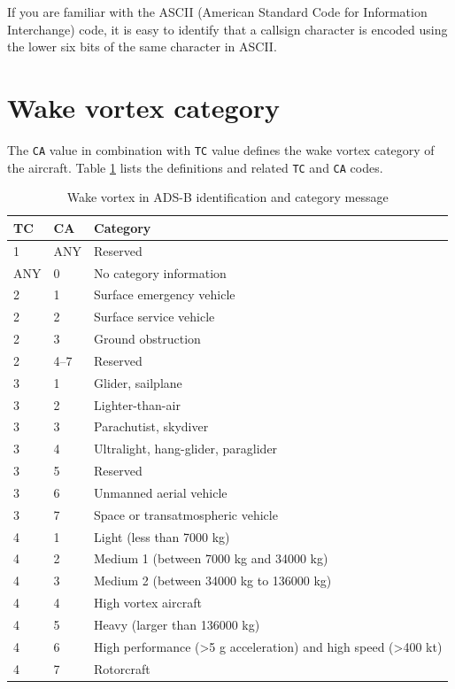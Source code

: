 If you are familiar with the ASCII (American Standard Code for Information Interchange) code, it is easy to identify that a callsign character is encoded using the lower six bits of the same character in ASCII.

\section{Wake vortex category}
The \texttt{CA} value in combination with \texttt{TC} value defines the wake vortex category of the aircraft. Table \ref{tb:adsb_id_wake_category} lists the definitions and related \texttt{TC} and \texttt{CA} codes.

\begin{table}[ht]
\caption{Wake vortex in ADS-B identification and category message}
\label{tb:adsb_id_wake_category}
\begin{tabular}{|l|l|l|}
\hline
\textbf{TC} & \textbf{CA} & \textbf{Category} \\ \hline\hline
1 & ANY & Reserved \\ \hline\hline
ANY & 0 & No category information \\ \hline\hline
2 & 1 & Surface emergency vehicle \\ \hline
2 & 2 & Surface service vehicle \\ \hline
2 & 3 & Ground obstruction \\ \hline
2 & 4--7 & Reserved \\ \hline\hline
3 & 1 & Glider, sailplane \\ \hline
3 & 2 & Lighter-than-air \\ \hline
3 & 3 & Parachutist, skydiver \\ \hline
3 & 4 & Ultralight, hang-glider, paraglider \\ \hline
3 & 5 & Reserved \\ \hline
3 & 6 & Unmanned aerial vehicle \\ \hline
3 & 7 & Space or transatmospheric vehicle \\ \hline\hline
4 & 1 & Light (less than 7000 kg) \\ \hline
4 & 2 & Medium 1 (between 7000 kg and 34000 kg) \\ \hline
4 & 3 & Medium 2 (between 34000 kg to 136000 kg) \\ \hline
4 & 4 & High vortex aircraft \\ \hline
4 & 5 & Heavy (larger than 136000 kg) \\ \hline
4 & 6 & High performance (\textgreater 5 g acceleration) and high speed (\textgreater 400 kt) \\ \hline
4 & 7 & Rotorcraft \\ \hline
\end{tabular}
\end{table}

